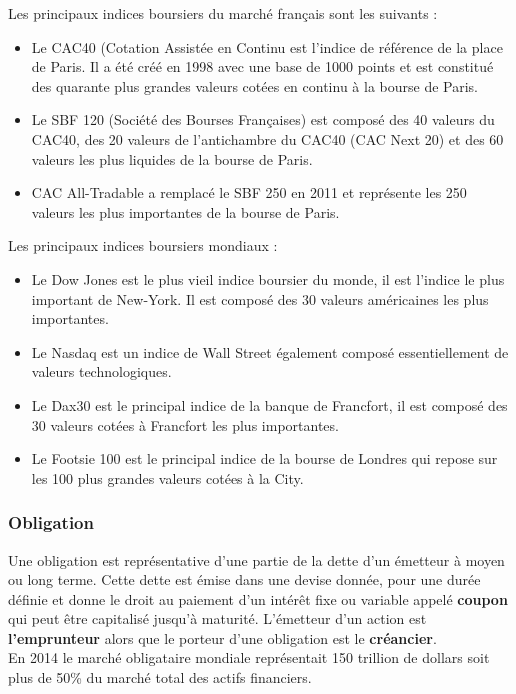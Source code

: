 Les principaux indices boursiers du marché français sont les suivants :
\begin{itemize}
\item Le CAC40 (Cotation Assistée en Continu est l'indice de référence de la place de Paris. Il a été créé en 1998 avec une base de 1000 points et est constitué des quarante plus grandes valeurs cotées en continu à la bourse de Paris. 
\item Le SBF 120 (Société des Bourses Françaises) est composé des 40 valeurs du CAC40, des 20 valeurs de l'antichambre du CAC40 (CAC Next 20) et des 60 valeurs les plus liquides de la bourse de Paris.
\item CAC All-Tradable a remplacé le SBF 250 en 2011 et représente les 250 valeurs les plus importantes de la bourse de Paris.  
\end{itemize}

Les principaux indices boursiers mondiaux : 
\begin{itemize}
\item Le Dow Jones est le plus vieil indice boursier du monde, il est l'indice le plus important de New-York. Il est composé des 30 valeurs américaines les plus importantes. 
\item Le Nasdaq est un indice de Wall Street également composé essentiellement de valeurs technologiques. 
\item Le Dax30 est le principal indice de la banque de Francfort, il est composé des 30 valeurs cotées à Francfort les plus importantes.
\item Le Footsie 100 est le principal indice de la bourse de Londres qui repose sur les 100 plus grandes valeurs cotées à la City. 
\end{itemize}

\subsubsection{Obligation}
Une obligation est représentative d'une partie de la dette d'un émetteur à moyen ou long terme. Cette dette est émise dans une devise donnée, pour une durée définie et donne le droit au paiement d'un intérêt fixe ou variable appelé \textbf{coupon} qui peut être capitalisé jusqu'à maturité. L'émetteur d'un action est \textbf{l'emprunteur} alors que le porteur d'une obligation est le \textbf{créancier}. \\

En 2014 le marché obligataire mondiale représentait 150 trillion de dollars soit plus de 50\% du marché total des actifs financiers. \\

